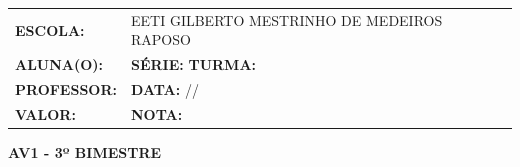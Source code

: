 \documentclass[12pt]{article}
\begin{document}
	\vspace{0.5cm}
	\begin{center}
		\large
		\begin{tabular}{|l l|}
			\hline
			\textbf{ESCOLA:} & EETI GILBERTO MESTRINHO DE MEDEIROS RAPOSO \\ 
			\textbf{ALUNA(O):} & \underline{\hspace{7cm}} \textbf{SÉRIE:} \underline{\hspace{1.5cm}} \textbf{TURMA:} \underline{\hspace{1.5cm}} \\
			\textbf{PROFESSOR:} & \underline{\hspace{7cm}} \textbf{DATA:} \underline{\hspace{1.5cm}}/\underline{\hspace{1.5cm}}/\underline{\hspace{1.5cm}} \\
			\textbf{VALOR:} & \underline{\hspace{3cm}} \textbf{NOTA:} \underline{\hspace{1.5cm}} \\
			\hline
		\end{tabular}
	\end{center}
	\vspace{0.5cm}
	
	\begin{center}
		\Large\textbf{AV1 - 3º BIMESTRE}
	\end{center}
	
	\vspace{0.3cm}
	
\end{document}
